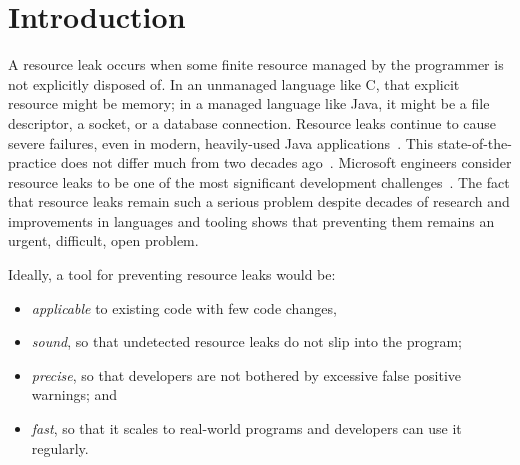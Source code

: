 \section{Introduction}
\label{sec:intro}


A resource leak occurs when some finite resource managed by the
programmer is not explicitly disposed of. In an unmanaged language
like C, that explicit resource might be memory; in a managed language
like Java, it might be a file descriptor, a socket, or a database
connection.  Resource leaks continue to cause severe failures, even in
modern, heavily-used Java applications~\cite{ghanavati2020memory}.
This state-of-the-practice does not differ much from two decades
ago~\cite{WeimerN04}.
Microsoft engineers consider resource leaks to be one of the most
significant development challenges~\cite{LoNZ2015}.  The fact that
resource leaks remain such a serious problem despite decades of
research and improvements in languages and tooling shows that
preventing them remains an urgent, difficult, open problem.


Ideally, a tool for preventing resource leaks would be:
\vspace{-5pt}
\begin{itemize}
\item \emph{applicable} to
  existing code with few code changes,
\item \emph{sound}, so that undetected resource leaks do not slip into
  the program;
\item \emph{precise}, so that developers are not bothered by excessive false positive
  warnings; and
\item \emph{fast}, so that it scales to real-world programs and
  developers can use it regularly.
\end{itemize}
\vspace{-5pt}

